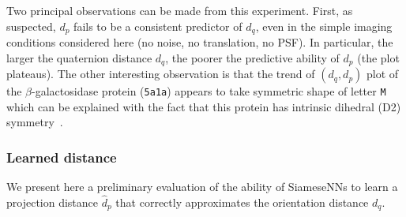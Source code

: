 Two principal observations can be made from this experiment.
First, as suspected, $d_p$ fails to be a consistent predictor of $d_q$, even in the simple imaging conditions considered here (no noise, no translation, no PSF).
In particular, the larger the quaternion distance $d_q$, the poorer the predictive ability of $d_p$ (the plot plateaus).
The other interesting observation is that the trend of $(d_q,d_p)$ plot of the $\beta$-galactosidase protein (\texttt{5a1a}) appears to take symmetric shape of letter \texttt{M} which can be explained with the fact that this protein has intrinsic dihedral (D2) symmetry~\cite{noauthor_d2sym_nodate,noauthor_5a1asym_nodate}.

\subsubsection{Learned distance}\label{sec:results:distance-estimation:learned}


We present here a preliminary evaluation of the ability of SiameseNNs to learn a projection distance $\widehat{d}_p$ that correctly approximates the orientation distance $d_q$.


